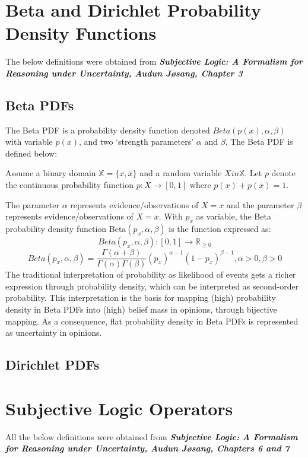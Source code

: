 \documentclass[UTF8]{article}
\newcommand{\mycite}[1]{\textbf{\textit{#1}}}
\begin{document}
\section{Beta and Dirichlet Probability Density Functions}
The below definitions were obtained from \mycite{Subjective Logic: A Formalism for Reasoning under Uncertainty, Audun Jøsang, Chapter 3}
\subsection{Beta PDFs}
The Beta PDF is a probability density function denoted $Beta(p(x),\alpha,\beta)$ with variable $p(x)$, and two ‘strength parameters’ $\alpha$ and $\beta$. The Beta PDF is defined below:

Assume a binary domain $\mathbb{X} = \{x, \overline{x}\}$ and a random variable $X in \mathbb{X}$. Let $p$ denote the continuous probability function $p : X \rightarrow [0,1]$ where $p(x) + p(\overline{x}) = 1$.

The parameter $\alpha$ represents evidence/observations of $X = x$ and the parameter $\beta$ represents evidence/observations of $X = \overline{x}$. With $p_x$ as variable, the Beta probability density function Beta$(p_x, \alpha, \beta)$ is the function expressed as:
$$ 
    Beta(p_x, \alpha, \beta) : [0, 1] \rightarrow \mathbb{R}_{\geq 0}
$$
$$
    Beta(p_x, \alpha, \beta) = \frac{\Gamma(\alpha + \beta)}{\Gamma(\alpha) \Gamma(\beta)} \left(p_x\right)^{\alpha - 1}\left(1 - p_x\right)^{\beta - 1}, \alpha > 0, \beta > 0
$$
The traditional interpretation of probability
as likelihood of events gets a richer expression through probability density, which
can be interpreted as second-order probability. This interpretation is the basis for
mapping (high) probability density in Beta PDFs into (high) belief mass in opinions, through bijective mapping. As a consequence, flat probability density in Beta PDFs is represented as uncertainty in opinions.

\subsection{Dirichlet PDFs}
\section{Subjective Logic Operators}

All the below definitions were obtained from \mycite{Subjective Logic: A Formalism for Reasoning under Uncertainty, Audun Jøsang, Chapters 6 and 7}\\
\end{document}
